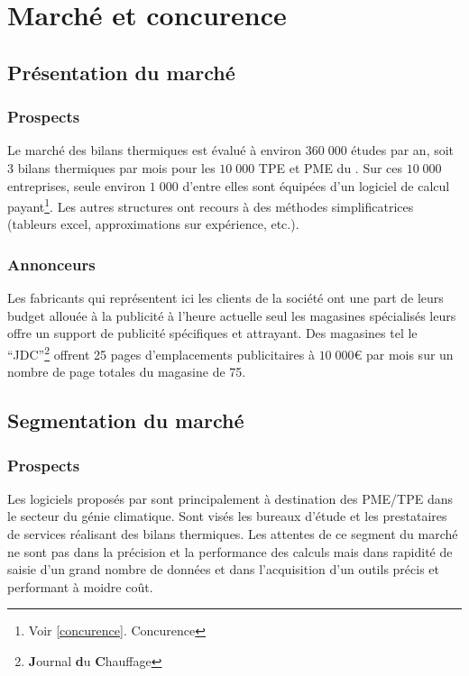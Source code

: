 \chapter{Marché et concurence}
	\section{Présentation du marché}\label{marché}
		\subsection{Prospects}
			\chiffresToulouse{}
			Le marché des bilans thermiques est évalué à environ $360\;000$ études par an,
			soit 3 bilans thermiques par mois pour les $10\;000$ TPE et PME du \gHabitat{}.
			Sur ces $10\;000$ entreprises, seule environ $1\;000$ d'entre elles sont équipées 
			d'un logiciel de calcul payant\footnote{Voir \ref{concurence}. Concurence}.
			Les autres structures ont recours à des méthodes simplificatrices
			(tableurs excel, approximations sur expérience, etc.).
	
		\subsection{Annonceurs}
		Les fabricants qui représentent ici les clients de la société \K{} ont une part de leurs budget allouée à la publicité à l'heure actuelle seul les magasines spécialisés leurs
		offre un support de publicité spécifiques et attrayant. Des magasines tel le ``JDC''\footnote{\textbf{J}ournal \textbf{d}u \textbf{C}hauffage} offrent 25 pages d'emplacements publicitaires
		à $10\;000$\euro{}{} par mois sur un nombre de page totales du magasine de 75.
		
	\section{Segmentation du marché}
		\subsection{Prospects}
		Les logiciels proposés par \K{} sont principalement à destination des PME/TPE dans le secteur du génie climatique.
		Sont visés les bureaux d'étude et les prestataires de services réalisant des bilans thermiques.
		Les attentes de ce segment du marché ne sont pas dans la précision et la performance des calculs mais dans
		rapidité de saisie d'un grand nombre de données et dans l'acquisition d'un outils précis et performant
		à moidre coût.\\

